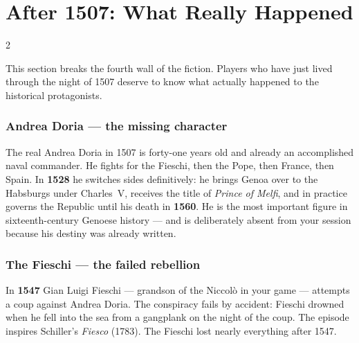 \section{After 1507: What Really Happened}
\label{sec:aftermath}

\begin{multicols}{2}

This section breaks the fourth wall of the fiction. Players who have just
lived through the night of 1507 deserve to know what actually happened
to the historical protagonists.

\subsubsection{Andrea Doria --- the missing character}


The real Andrea Doria in 1507 is forty-one years old and already an
accomplished naval commander. He fights for the Fieschi, then the Pope,
then France, then Spain. In \textbf{1528} he switches sides definitively:
he brings Genoa over to the Habsburgs under Charles~V, receives the title
of \textit{Prince of Melfi}, and in practice governs the Republic until
his death in \textbf{1560}. He is the most important figure in
sixteenth-century Genoese history --- and is deliberately absent from
your session because his destiny was already written.

\columnbreak

\subsubsection{The Fieschi --- the failed rebellion}


In \textbf{1547} Gian Luigi Fieschi --- grandson of the Niccolò in your
game --- attempts a coup against Andrea Doria. The conspiracy fails by
accident: Fieschi drowned when he fell into the sea from a gangplank on
the night of the coup. The episode inspires Schiller's \textit{Fiesco}
(1783). The Fieschi lost nearly everything after 1547.


\end{multicols}

